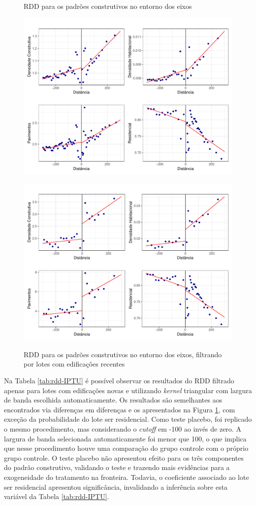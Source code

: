 \begin{figure}[!h]
    \centering

    \caption{RDD para os padrões construtivos no entorno dos eixos}
    \includegraphics[width = .85\textwidth]{figuras/rdd-plot-IPTU.pdf}
    \label{fig:rdd-IPTU}

    \caption{RDD para os padrões construtivos no entorno dos eixos, filtrando por lotes com edificações recentes}
    \includegraphics[width = .85\textwidth]{figuras/rdd-plot-IPTU-posPDE.pdf}
    \label{fig:rdd-IPTU-posPDE}
\end{figure}


Na Tabela \ref{tab:rdd-IPTU} é possível observar os resultados do RDD filtrado apenas para lotes com edificações novas e utilizando \textit{kernel} triangular com largura de banda escolhida automaticamente. Os resultados são semelhantes aos encontrados via diferenças em diferenças e os apresentados na Figura \ref{fig:rdd-IPTU-posPDE}, com exceção da probabilidade do lote ser residencial. Como teste placebo, foi replicado o mesmo procedimento, mas considerando o \textit{cutoff} em -100 ao invés de zero. A largura de banda selecionada automaticamente foi menor que 100, o que implica que nesse procedimento houve uma comparação do grupo controle com o próprio grupo controle. O teste placebo não apresentou efeito para os três componentes do padrão construtivo, validando o teste e trazendo mais evidências para a exogeneidade do tratamento na fronteira. Todavia, o coeficiente associado ao lote ser residencial apresentou significância, invalidando a inferência sobre esta variável da Tabela \ref{tab:rdd-IPTU}.


